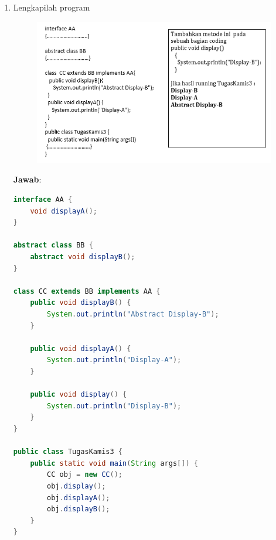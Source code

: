 \documentclass[a4paper, 12pt]{article}
\newcommand{\ans}{\textbf{Jawab}:}
\begin{document}
\begin{enumerate}
        \newpage
        \item Lengkapilah program 
        \begin{figure}[h]
            \centering
            \includegraphics[width=1\linewidth]{No3.png}
        \end{figure}

        \newpage
        \ans
        \begin{lstlisting}[language=java , breaklines=true]
interface AA {
    void displayA();
}

abstract class BB {
    abstract void displayB();
}

class CC extends BB implements AA {
    public void displayB() {
        System.out.println("Abstract Display-B");
    }

    public void displayA() {
        System.out.println("Display-A");
    }

    public void display() {
        System.out.println("Display-B");
    }
}

public class TugasKamis3 {
    public static void main(String args[]) {
        CC obj = new CC();
        obj.display();
        obj.displayA();
        obj.displayB();
    }
}

        \end{lstlisting}
    \end{enumerate}
\end{document}
